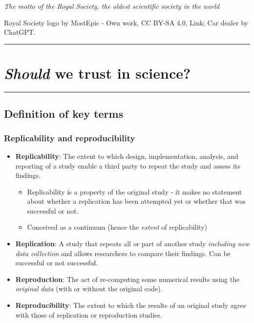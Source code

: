 \documentclass[
  english,
  letterpaper,
  DIV=11,
  numbers=noendperiod]{scrartcl}
\providecommand{\tightlist}{%
  \setlength{\itemsep}{0pt}\setlength{\parskip}{0pt}}
\begin{document}
{\emph{The motto of the Royal Society, the oldest scientific society in
the world}}

Royal Society logo by MostEpic - \foreignlanguage{english}{Own work}, CC
BY-SA 4.0, Link; Car dealer by ChatGPT.

\begin{center}\rule{0.5\linewidth}{0.5pt}\end{center}

\section{\texorpdfstring{\emph{Should} we trust in
science?}{Should we trust in science?}}\label{should-we-trust-in-science}

\begin{center}\rule{0.5\linewidth}{0.5pt}\end{center}

\subsection{Definition of key terms}\label{definition-of-key-terms}

\subsubsection{Replicability and
reproducibility}\label{replicability-and-reproducibility}

\begin{itemize}
\tightlist
\item
  \textbf{Replicability}: The extent to which design, implementation,
  analysis, and reporting of a study enable a third party to repeat the
  study and assess its findings.

  \begin{itemize}
  \tightlist
  \item
    {Replicability is a property of the original study - it makes no
    statement about whether a replication has been attempted yet or
    whether that was successful or not.}
  \item
    {Conceived as a continuum (hence the \emph{extent} of
    replicability)}
  \end{itemize}
\item
  \textbf{Replication}: A study that repeats all or part of another
  study \emph{including new data collection} and allows researchers to
  compare their findings. Can be successful or not successful.
\item
  \textbf{Reproduction}: The act of re-computing some numerical results
  using the \emph{original data} (with or without the original code).
\item
  \textbf{Reproducibility}: The extent to which the results of an
  original study agree with those of replication or reproduction
  studies.
\end{itemize}
\end{document}
